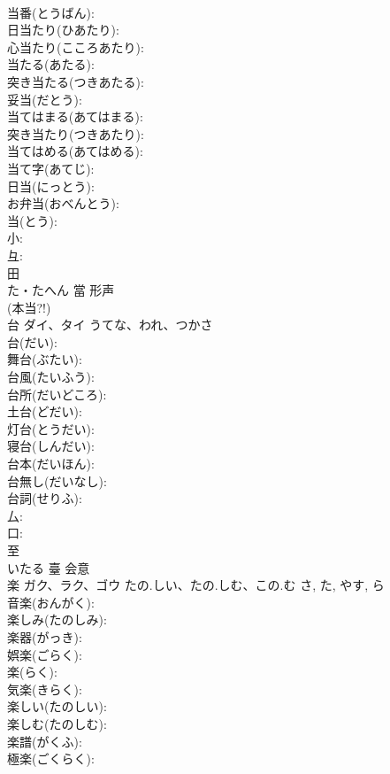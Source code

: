 \documentclass[8pt]{extreport}
\begin{document}
\begin{CJK}{UTF8}{min}
\\	当番(とうばん): 
\\	日当たり(ひあたり): 
\\	心当たり(こころあたり): 
\\	当たる(あたる): 
\\	突き当たる(つきあたる): 
\\	妥当(だとう): 
\\	当てはまる(あてはまる): 
\\	突き当たり(つきあたり): 
\\	当てはめる(あてはめる): 
\\	当て字(あてじ): 
\\	日当(にっとう): 
\\	お弁当(おべんとう): 
\\	当(とう): 
\\	小: 
\\	彑: 
\\	田	
\\	た・たへん	當	形声 
\\	(本当?!)
\\	台	ダイ、タイ	うてな、われ、つかさ		
\\	台(だい): 
\\	舞台(ぶたい): 
\\	台風(たいふう): 
\\	台所(だいどころ): 
\\	土台(どだい): 
\\	灯台(とうだい): 
\\	寝台(しんだい): 
\\	台本(だいほん): 
\\	台無し(だいなし): 
\\	台詞(せりふ): 
\\	厶: 
\\	口: 
\\	至	
\\	いたる	臺	会意 
\\	楽	ガク、ラク、ゴウ	たの.しい、たの.しむ、この.む	さ, た, やす, ら	
\\	音楽(おんがく): 
\\	楽しみ(たのしみ): 
\\	楽器(がっき): 
\\	娯楽(ごらく): 
\\	楽(らく): 
\\	気楽(きらく): 
\\	楽しい(たのしい): 
\\	楽しむ(たのしむ): 
\\	楽譜(がくふ): 
\\	極楽(ごくらく): 

\end{CJK}
\end{document}
